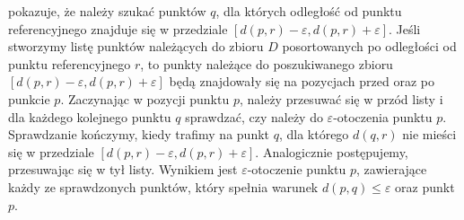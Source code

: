  pokazuje, że należy szukać punktów $ q $, dla których odległość od punktu referencyjnego znajduje się w przedziale $ \left[d(p,r)-\varepsilon,d(p,r)+\varepsilon\right]$. Jeśli stworzymy listę punktów należących do zbioru $ D $ posortowanych po odległości od punktu referencyjnego $ r $, to punkty należące do poszukiwanego zbioru $ \left[d(p,r)-\varepsilon,d(p,r)+\varepsilon\right] $ będą znajdowały się na pozycjach przed oraz po punkcie $ p $. Zaczynając w pozycji punktu $ p $, należy przesuwać się w przód listy i dla każdego kolejnego punktu $ q $ sprawdzać, czy należy do $ \varepsilon $-otoczenia punktu $ p $. Sprawdzanie kończymy, kiedy trafimy na punkt $ q $, dla którego $ d(q,r) $ nie mieści się w przedziale $ \left[d(p,r)-\varepsilon,d(p,r)+\varepsilon\right] $. Analogicznie postępujemy, przesuwając się w tył listy. Wynikiem jest $ \varepsilon $-otoczenie punktu $ p $, zawierające każdy ze sprawdzonych punktów, który spełnia warunek $ d(p,q) \le \varepsilon $ oraz punkt $ p $.
